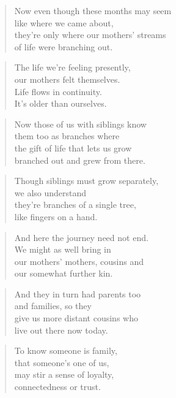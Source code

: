 \documentclass[10pt,a4paper]{article}
\begin{document}
\begin{multicols}{2}
\begin{verse}
Now even though these months may seem\\
like where we came about,\\
they’re only where our mothers’ streams\\
of life were branching out.
\end{verse}

\begin{verse}
The life we’re feeling presently,\\
our mothers felt themselves.\\
Life flows in continuity.\\
It’s older than ourselves.
\end{verse}

\begin{verse}
Now those of us with siblings know\\
them too as branches where\\
the gift of life that lets us grow\\
branched out and grew from there.
\end{verse}

\begin{verse}
Though siblings must grow separately,\\
we also understand\\
they’re branches of a single tree,\\
like fingers on a hand.
\end{verse}

\begin{verse}
And here the journey need not end.\\
We might as well bring in\\
our mothers’ mothers, cousins and\\
our somewhat further kin.
\end{verse}

\begin{verse}
And they in turn had parents too\\
and families, so they\\
give us more distant cousins who\\
live out there now today.
\end{verse}

\begin{verse}
To know someone is family,\\
that someone’s one of us,\\
may stir a sense of loyalty,\\
connectedness or trust.
\end{verse}


\end{multicols}
\end{document}
